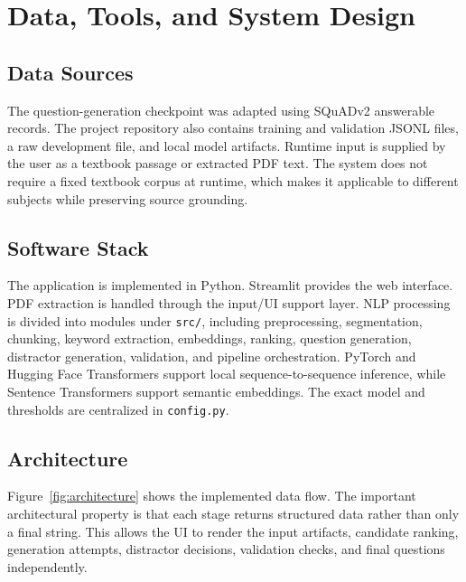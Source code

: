 \documentclass[12pt,a4paper]{report}
\newcommand{\code}[1]{\texttt{#1}}
\begin{document}
\clearpage
\chapter{Data, Tools, and System Design}
\section{Data Sources}
The question-generation checkpoint was adapted using SQuADv2 answerable records. The project repository also contains training and validation JSONL files, a raw development file, and local model artifacts. Runtime input is supplied by the user as a textbook passage or extracted PDF text. The system does not require a fixed textbook corpus at runtime, which makes it applicable to different subjects while preserving source grounding.

\section{Software Stack}
The application is implemented in Python. Streamlit provides the web interface. PDF extraction is handled through the input/UI support layer. NLP processing is divided into modules under \code{src/}, including preprocessing, segmentation, chunking, keyword extraction, embeddings, ranking, question generation, distractor generation, validation, and pipeline orchestration. PyTorch and Hugging Face Transformers support local sequence-to-sequence inference, while Sentence Transformers support semantic embeddings. The exact model and thresholds are centralized in \code{config.py}.

\section{Architecture}
Figure~\ref{fig:architecture} shows the implemented data flow. The important architectural property is that each stage returns structured data rather than only a final string. This allows the UI to render the input artifacts, candidate ranking, generation attempts, distractor decisions, validation checks, and final questions independently.
\end{document}
